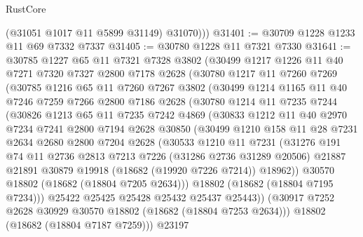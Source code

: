 \begin{lexlean}{RustCore}
\begin{coremodule}
          (@31051 @1017 @11 @5899 @31149)
          @31070)))
@31401 := @30709 @1228 @1233 @11 @69 @7332 @7337
@31405 := @30780 @1228 @11 @7321 @7330
@31641 := @30785
    @1227
    @65
    @11
    @7321
    @7328
    @3802
    (@30499
      @1217
      @1226
      @11
      @40
      @7271
      @7320
      @7327
      @2800
      @7178
      @2628
      (@30780
        @1217
        @11
        @7260
        @7269
        (@30785
          @1216
          @65
          @11
          @7260
          @7267
          @3802
          (@30499
            @1214
            @1165
            @11
            @40
            @7246
            @7259
            @7266
            @2800
            @7186
            @2628
            (@30780
              @1214
              @11
              @7235
              @7244
              (@30826
                @1213
                @65
                @11
                @7235
                @7242
                @4869
                (@30833
                  @1212
                  @11
                  @40
                  @2970
                  @7234
                  @7241
                  @2800
                  @7194
                  @2628
                  @30850
                  (@30499
                    @1210
                    @158
                    @11
                    @28
                    @7231
                    @2634
                    @2680
                    @2800
                    @7204
                    @2628
                    (@30533
                      @1210
                      @11
                      @7231
                      (@31276
                        @191
                        @74
                        @11
                        @2736
                        @2813
                        @7213
                        @7226
                        (@31286 @2736 @31289 @20506)
                        @21887
                        @21891
                        @30879
                        @19918
                        (@18682 (@19920 @7226 @7214))
                        @18962))
                    @30570
                    @18802
                    (@18682 (@18804 @7205 @2634)))
                  @18802
                  (@18682 (@18804 @7195 @7234)))
                @25422
                @25425
                @25428
                @25432
                @25437
                @25443))
            (@30917 @7252 @2628 @30929 @30570 @18802 (@18682 (@18804 @7253 @2634)))
            @18802
            (@18682 (@18804 @7187 @7259)))
          @23197

\end{coremodule}
\end{lexlean}
